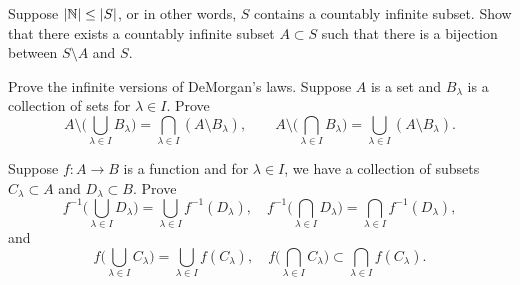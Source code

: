 \begin{exercise}[Challenging] \label{exercise:countsubsetbij}
Suppose $\lvert {{\mathbb{N}}} \rvert \leq \lvert {S} \rvert$, or in other words, $S$
contains a countably infinite subset.
Show that there exists a countably infinite subset $A \subset S$
such that there is 
a bijection between $S \setminus A$ and $S$.
\end{exercise}

\begin{exercise}
Prove the infinite versions of DeMorgan's laws.
Suppose $A$ is a set and $B_\lambda$ is a collection of sets for $\lambda
\in I$.  Prove
\begin{equation*}
A \setminus \biggl(
\bigcup_{\lambda \in I} B_\lambda
\biggr)
=
\bigcap_{\lambda \in I}
(
A \setminus
B_\lambda
) ,
\qquad
A \setminus \biggl(
\bigcap_{\lambda \in I} B_\lambda
\biggr)
=
\bigcup_{\lambda \in I}
(
A \setminus
B_\lambda
) .
\end{equation*}
\end{exercise}

\begin{exercise}
Suppose $f \colon A \to B$ is a function and for $\lambda \in I$, we have
a collection of subsets $C_\lambda \subset A$ and
$D_\lambda \subset B$.  Prove
\begin{equation*}
f^{-1} \biggl(
\bigcup_{\lambda \in I} D_\lambda
\biggr)
=
\bigcup_{\lambda \in I}
f^{-1}(D_\lambda) ,
\quad
f^{-1} \biggl(
\bigcap_{\lambda \in I} D_\lambda
\biggr)
=
\bigcap_{\lambda \in I}
f^{-1}(D_\lambda) ,
\end{equation*}
and
\begin{equation*}
f \biggl(
\bigcup_{\lambda \in I} C_\lambda
\biggr)
=
\bigcup_{\lambda \in I}
f(C_\lambda) ,
\quad
f \biggl(
\bigcap_{\lambda \in I} C_\lambda
\biggr)
\subset
\bigcap_{\lambda \in I}
f(C_\lambda) .
\end{equation*}
\end{exercise}
